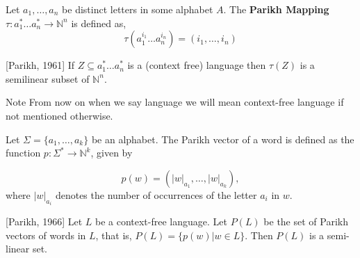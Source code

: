 \documentclass{beamer}
\newcommand{\N}{\mathbb{N}}
\begin{document}
\begin{frame}

\begin{definition}\label{defn:Parikh mapping}
Let $a_1,\dots,a_n$ be distinct letters in some alphabet $A$. The \textbf{Parikh Mapping} 
$\tau : a_1^* \dots a_n^* \to \N ^n$ is defined as,
\[ \tau (a_1 ^{i_1}\dots a_n^{i_n}) = (i_1,\dots,i_n) \] 
\end{definition}

\begin{theorem}\label{thm:Parikh,1961}
[Parikh, 1961] If $Z\subseteq a_1^* \dots a_n^*$ is a (context free) language then $\tau(Z)$ is a semilinear subset
of $\N ^n$.
\end{theorem}

\begin{block}{Note}
From now on when we say language we will mean context-free language if not mentioned otherwise.
\end{block}

\end{frame}

\begin{frame}

\begin{definition}\label{defn:Parikh vector}
Let $\Sigma =\{a_{1},\dots ,a_{k}\}$ be an alphabet. The Parikh vector of a word is defined as the function 
$ p:\Sigma ^* \to \N^k $, given by

\[ p(w)=(|w|_{a_1},\dots ,|w|_{a_k}),\] 
where $|w|_{a_i}$ denotes the number of occurrences of the letter $a_i$ in $w$.
\end{definition}

\begin{theorem}\label{thm:Parikh,1966}
[Parikh, 1966]  Let $L$ be a context-free language. Let $P(L)$ be the set of Parikh vectors of words in $L$, 
that is, $P(L)=\{p(w)| w \in L\}.$ Then $P(L)$ is a semi-linear set.
\end{theorem}

\end{frame}
\end{document}
